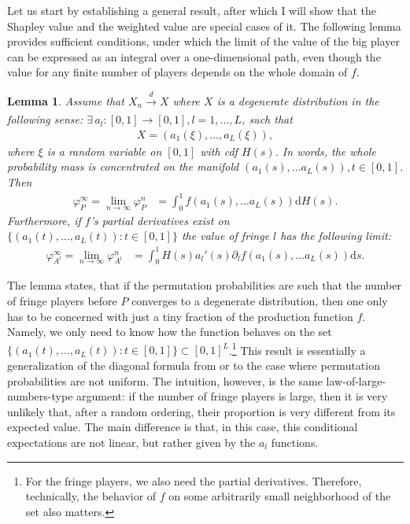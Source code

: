 \documentclass[a4paper]{article}
\newtheorem{lemma}{Lemma}
\newcommand{\ds}{\mathrm{d}s}
\begin{document}
Let us start by establishing a general result, after which I will show that the Shapley value and the weighted value are special cases of it.
The following lemma provides sufficient conditions, under which the limit of the value of the big player can be expressed as an integral over a one-dimensional path, even though the value for any finite number of players depends on the whole domain of $f$.
\begin{lemma}
    \label{lem:many_sided_manifold}
    Assume that $X_n \xrightarrow[]{d} X$ where $X$ is a degenerate distribution in the following sense: $\exists \, a_l: [0, 1] \to [0, 1], l = 1, \dots, L$, such that
    \begin{align*}
        X = (a_1(\xi), \dots, a_L(\xi)),
    \end{align*}
    where $\xi$ is a random variable on $[0, 1]$ with cdf $H(s)$.
    In words, the whole probability mass is concentrated on the manifold $(a_1(s), \dots a_L(s)), t \in [0, 1]$.
    Then
    \begin{align*}
        \varphi_P^\infty = \lim_{n \to \infty} \varphi_P^n &= \int_0^1 f(a_1(s), \dots a_L(s)) \mathrm{d}H(s).
    \end{align*}
    Furthermore, if $f$'s partial derivatives exist on $\{(a_1(t), \dots, a_L(t)) : t \in [0, 1]\}$ the value of fringe $l$ has the following limit:
    \begin{align*}
        \varphi_{A^l}^\infty = \lim_{n \to \infty} \varphi_{A^l}^n &= \int_0^1 H(s) a_l'(s) \partial_l f(a_1(s), \dots a_L(s)) \ds.
    \end{align*}
\end{lemma}

The lemma states, that if the permutation probabilities are such that the number of fringe players before $P$ converges to a degenerate distribution, then one only has to be concerned with just a tiny fraction of the production function $f$.
Namely, we only need to know how the function behaves on the set $\{(a_1(t), \dots, a_L(t)) : t \in [0, 1]\} \subset [0, 1]^L$.\footnote{
    For the fringe players, we also need the partial derivatives.
    Therefore, technically, the behavior of $f$ on some arbitrarily small neighborhood of the set also matters.
}
This result is essentially a generalization of the diagonal formula from \textcite{aumann2015values} or \textcite{stole1996intra} to the case where permutation probabilities are not uniform.
The intuition, however, is the same law-of-large-numbers-type argument: if the number of fringe players is large, then it is very unlikely that, after a random ordering, their proportion is very different from its expected value.
The main difference is that, in this case, this conditional expectations are not linear, but rather given by the $a_l$ functions.
\end{document}
